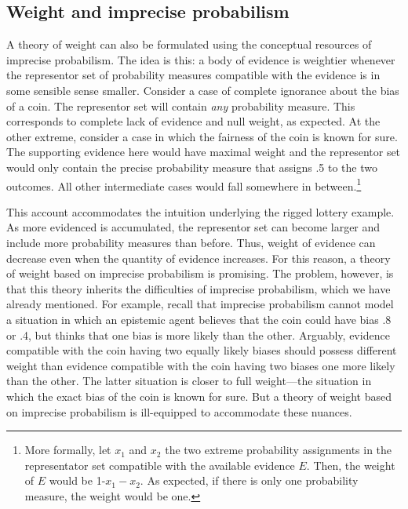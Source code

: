 \documentclass[
  10pt,
  dvipsnames,enabledeprecatedfontcommands]{scrartcl}
\begin{document}
\hypertarget{weight-and-imprecise-probabilism}{%
\subsection{Weight and imprecise
probabilism}\label{weight-and-imprecise-probabilism}}

A theory of weight can also be formulated using the conceptual resources
of imprecise probabilism.
 The idea is
this: a body of evidence is weightier whenever the representor set of
probability measures compatible with the evidence is in some sensible
sense smaller. Consider a case of complete ignorance about the bias of a
coin. The representor set will contain \emph{any} probability measure.
This corresponds to complete lack of evidence and null weight, as
expected. At the other extreme, consider a case in which the fairness of
the coin is known for sure. The supporting evidence here would have
maximal weight and the representor set would only contain the precise
probability measure that assigns .5 to the two outcomes. All other
intermediate cases would fall somewhere in between.\footnote{More
  formally, let \(x_1\) and \(x_2\) the two extreme probability
  assignments in the representator set compatible with the available
  evidence \(E\). Then, the weight of \(E\) would be 1-\(x_1-x_2\). As
  expected, if there is only one probability measure, the weight would
  be one.}

This account accommodates the intuition underlying the rigged lottery
example. As more evidenced is accumulated, the representor set can
become larger and include more probability measures than before. Thus,
weight of evidence can decrease even when the quantity of evidence
increases. For this reason, a theory of weight based on imprecise
probabilism is promising. The problem, however, is that this theory
inherits the difficulties of imprecise probabilism, which we have
already mentioned. For example, recall that imprecise probabilism cannot
model a situation in which an epistemic agent believes that the coin
could have bias .8 or .4, but thinks that one bias is more likely than
the other. Arguably, evidence compatible with the coin having two
equally likely biases should possess different weight than evidence
compatible with the coin having two biases one more likely than the
other. The latter situation is closer to full weight---the situation in
which the exact bias of the coin is known for sure. But a theory of
weight based on imprecise probabilism is ill-equipped to accommodate
these nuances.
\end{document}
